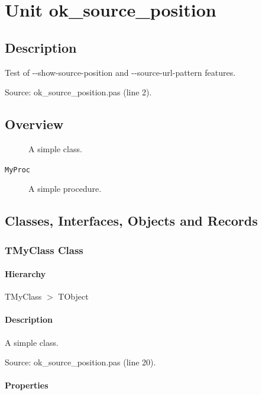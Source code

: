 \documentclass{report}
\begin{document}
\newlength{\tmplength}
\chapter{Unit ok{\_}source{\_}position}
\section{Description}
Test of {-}{-}show{-}source{-}position and {-}{-}source{-}url{-}pattern features.\par
Source: ok{\_}source{\_}position.pas (line 2).
\section{Overview}
\begin{description}
\item[\texttt{\begin{ttfamily}TMyClass\end{ttfamily} Class}]A simple class.
\end{description}
\begin{description}
\item[\texttt{MyProc}]A simple procedure.
\end{description}
\section{Classes, Interfaces, Objects and Records}
\subsection*{TMyClass Class}
\subsubsection*{\large{\textbf{Hierarchy}}\normalsize\hspace{1ex}\hfill}
TMyClass {$>$} TObject
\subsubsection*{\large{\textbf{Description}}\normalsize\hspace{1ex}\hfill}
A simple class.\par
Source: ok{\_}source{\_}position.pas (line 20).\subsubsection*{\large{\textbf{Properties}}\normalsize\hspace{1ex}\hfill}
\end{document}
